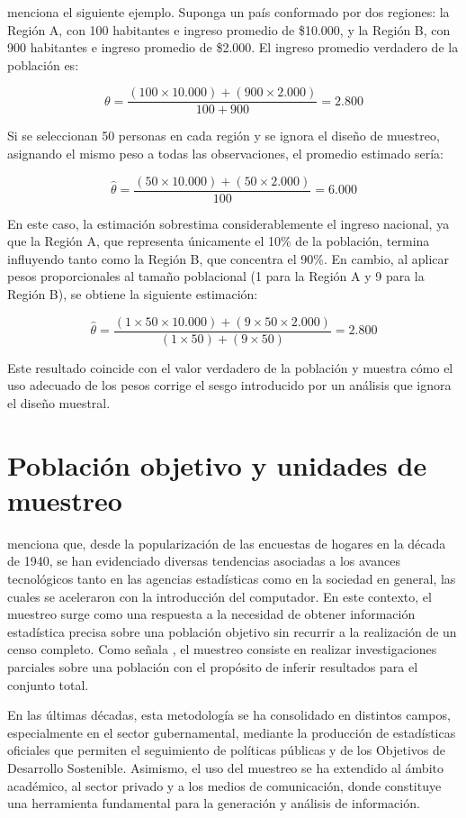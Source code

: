\documentclass[
  spanish,
  12pt,
]{book}
\begin{document}
\citet{UNhandbook} menciona el siguiente ejemplo. Suponga un país conformado por dos regiones: la Región A, con 100 habitantes e ingreso promedio de \$10.000, y la Región B, con 900 habitantes e ingreso promedio de \$2.000. El ingreso promedio verdadero de la población es:

\[
\theta = \frac{(100 \times 10.000) + (900 \times 2.000)}{100 + 900} = 2.800
\]

Si se seleccionan 50 personas en cada región y se ignora el diseño de muestreo, asignando el mismo peso a todas las observaciones, el promedio estimado sería:

\[
\hat{\theta} = \frac{(50 \times 10.000) + (50 \times 2.000)}{100} = 6.000
\]

En este caso, la estimación sobrestima considerablemente el ingreso nacional, ya que la Región A, que representa únicamente el 10\% de la población, termina influyendo tanto como la Región B, que concentra el 90\%. En cambio, al aplicar pesos proporcionales al tamaño poblacional (1 para la Región A y 9 para la Región B), se obtiene la siguiente estimación:

\[
\hat{\theta} = \frac{(1 \times 50 \times 10.000) + (9 \times 50 \times 2.000)}{(1 \times 50) + (9 \times 50)} = 2.800
\]

Este resultado coincide con el valor verdadero de la población y muestra cómo el uso adecuado de los pesos corrige el sesgo introducido por un análisis que ignora el diseño muestral.

\section{Población objetivo y unidades de muestreo}\label{poblacion-objetivo-y-unidades-de-muestreo}

\citet{gambino2009sampling} menciona que, desde la popularización de las encuestas de hogares en la década de 1940, se han evidenciado diversas tendencias asociadas a los avances tecnológicos tanto en las agencias estadísticas como en la sociedad en general, las cuales se aceleraron con la introducción del computador. En este contexto, el muestreo surge como una respuesta a la necesidad de obtener información estadística precisa sobre una población objetivo sin recurrir a la realización de un censo completo. Como señala \citet{Gutierrez2016}, el muestreo consiste en realizar investigaciones parciales sobre una población con el propósito de inferir resultados para el conjunto total.

En las últimas décadas, esta metodología se ha consolidado en distintos campos, especialmente en el sector gubernamental, mediante la producción de estadísticas oficiales que permiten el seguimiento de políticas públicas y de los Objetivos de Desarrollo Sostenible. Asimismo, el uso del muestreo se ha extendido al ámbito académico, al sector privado y a los medios de comunicación, donde constituye una herramienta fundamental para la generación y análisis de información.
\end{document}
